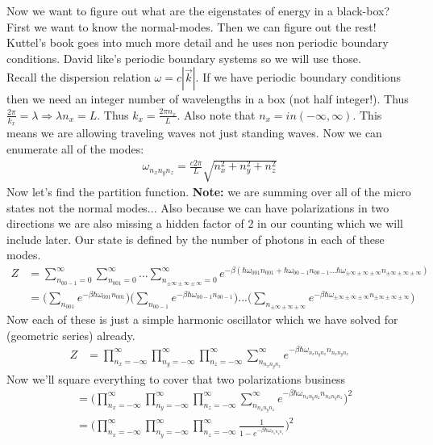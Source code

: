 \documentclass[a4paper, 11pt]{article}
\begin{document}
	\noindent Now we want to figure out what are the eigenstates of energy in a black-box? First we want to know the normal-modes. Then we can figure out the rest! Kuttel's book goes into much more detail and he uses non periodic boundary conditions. David like's periodic boundary systems so we will use those. \\
	
	\noindent Recall the dispersion relation $\omega = c|\vec{k}|$. If we have periodic boundary conditions then we need an integer number of wavelengths in a box (not half integer!). Thus $\frac{2\pi}{k_x} =\lambda \Rightarrow \lambda n_x = L$. Thus $k_x = \frac{2\pi n_x}{L}$. Also note that $n_x =in (-\infty, \infty)$. This means we are allowing traveling waves not just standing waves. Now we can enumerate all of the modes: 
		\begin{align*}
			\omega_{n_xn_yn_z} = \frac{c2\pi}{L}\sqrt{n_x^2+n_y^2+n_z^2}
		\end{align*}
	\noindent Now let's find the partition function. \textbf{Note:} we are summing over all of the micro states not the normal modes... Also because we can have polarizations in two directions we are also missing a hidden factor of 2 in our counting which we will include later. Our state is defined by the number of photons in each of these modes.
		\begin{align*}
			Z &= \sum\limits_{n_{00-1}=0}^\infty\sum\limits_{n_{001}=0}^\infty...\sum\limits_{n_{\pm\infty \pm\infty \pm\infty}=0}^\infty e^{-\beta (\hbar\omega_{001}n_{001}+\hbar\omega_{00-1}n_{00-1}...\hbar\omega_{\pm\infty\pm\infty\pm\infty}n_{\pm\infty\pm\infty\pm\infty})} \\ 
			&= \Big(\sum\limits_{n_{001}}e^{-\beta\hbar\omega_{001}n_{001}}\Big)\Big(\sum\limits_{n_{00-1}}e^{-\beta\hbar\omega_{00-1}n_{00-1}}\Big)...\Big(\sum\limits_{n_{\pm\infty\pm\infty\pm\infty}}e^{-\beta\hbar\omega_{\pm\infty\pm\infty\pm\infty}n_{\pm\infty\pm\infty\pm\infty}}\Big)
		\end{align*}
	\noindent Now each of these is just a simple harmonic oscillator which we have solved for (geometric series) already. 
		\begin{align*}
			Z &= \prod\limits_{n_x=-\infty}^\infty\prod\limits_{n_y=-\infty}^\infty\prod\limits_{n_z=-\infty}^\infty \sum\limits_{n_{n_xn_yn_z}}^{\infty} e^{-\beta\hbar\omega_{n_xn_yn_z}n_{n_xn_yn_z}}
		\end{align*}
	Now we'll square everything to cover that two polarizations business 
		\begin{align*}
			&= \Big(\prod\limits_{n_x=-\infty}^\infty\prod\limits_{n_y=-\infty}^\infty\prod\limits_{n_z=-\infty}^\infty \sum\limits_{n_{n_xn_yn_z}}^{\infty} e^{-\beta\hbar\omega_{n_xn_yn_z}n_{n_xn_yn_z}}\Big)^2 \\ 
			&= \Big(\prod\limits_{n_x=-\infty}^\infty\prod\limits_{n_y=-\infty}^\infty\prod\limits_{n_z=-\infty}^\infty \frac{1}{1-e^{-\beta\hbar\omega_{n_xn_yn_z}}}\Big)^2
		\end{align*}		
\end{document}
